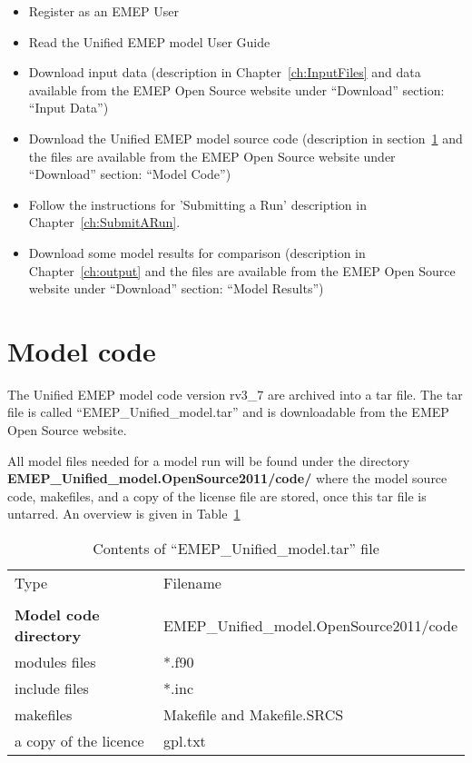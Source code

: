 \begin{itemize}
\item Register as an EMEP User
\item Read the Unified EMEP model User Guide
\item
Download input data (description in Chapter~\ref{ch:InputFiles} and
data available from the EMEP Open Source website under ``Download''
section: ``Input Data'')
\item
Download the Unified EMEP model source code (description in 
section~\ref{sec:ModelCode} and the files are available from the EMEP 
Open Source website under ``Download'' section: ``Model Code'')
\item
Follow the instructions for 'Submitting a Run' description in
Chapter~\ref{ch:SubmitARun}.%
\item
Download some model results for comparison (description in
Chapter~\ref{ch:output} and the files are available from the EMEP 
Open Source website under ``Download'' section: ``Model Results'')
\end{itemize}

\section{Model code}
\label{sec:ModelCode}

The Unified EMEP model code version rv3\_7 are archived into a tar file. 
The tar file is called ``EMEP\_Unified\_model.tar'' and is downloadable from
the EMEP Open Source website.

All model files needed for a model run will be found under the
directory \\ {\bf EMEP\_Unified\_model.OpenSource2011/code/} where the model source code, 
makefiles, and a copy of the license file are stored, 
once this tar file is untarred. An overview is given in 
Table~\ref{Tab:modelfiles}

\begin{table}[h]
\begin{center}
\caption{Contents of ``EMEP\_Unified\_model.tar'' file
   \label{Tab:modelfiles}}
\begin{tabular}{ll}
& \\
\hline
Type      & Filename          \\
\hline
& \\
{\bf Model code directory} & EMEP\_Unified\_model.OpenSource2011/code \\ 
\hline
modules files & *.f90 \\
include files & *.inc \\
makefiles & Makefile and Makefile.SRCS \\
a copy of the licence & gpl.txt \\
\hline
\end{tabular}
\end{center}
\end{table}

